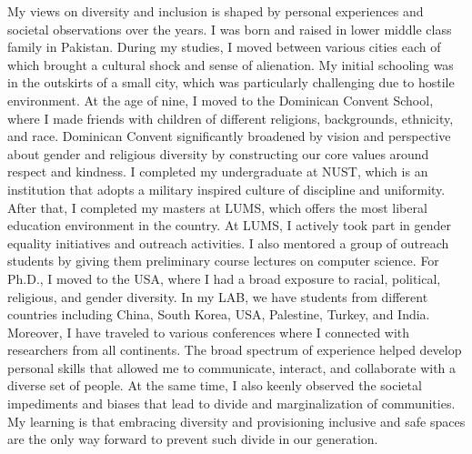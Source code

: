 \documentclass{NSF}
\begin{document}
My views on diversity and inclusion is shaped by personal experiences and societal observations over the years. I was born and raised in lower middle class family in Pakistan. During my studies, I moved between various cities each of which brought a cultural shock and sense of alienation. My initial schooling was in the outskirts of a small city, which was particularly challenging due to hostile environment. At the age of nine, I moved to the Dominican Convent School, where I made friends with children of different religions, backgrounds, ethnicity, and race. Dominican Convent significantly broadened by vision and perspective about gender and religious diversity by constructing our core values around respect and kindness. I completed my undergraduate at NUST, which is an institution that adopts a military inspired culture of discipline and uniformity. After that, I completed my masters at LUMS, which offers the most liberal education environment in the country. At LUMS, I actively took part in gender equality initiatives and outreach activities. I also mentored a group of outreach students by giving them preliminary course lectures on computer science. For Ph.D., I moved to the USA, where I had a broad exposure to racial, political, religious, and gender diversity. In my LAB, we have students from different countries including China, South Korea, USA, Palestine, Turkey, and India. Moreover, I have traveled to various conferences where I connected with researchers from all continents. The broad spectrum of experience helped develop personal skills that allowed me to communicate, interact, and collaborate with a diverse set of people. At the same time, I also keenly observed the societal impediments and biases that lead to divide and marginalization of communities. My learning is that embracing diversity and provisioning inclusive and safe spaces are the only way forward to prevent such divide in our generation. 
\end{document}
